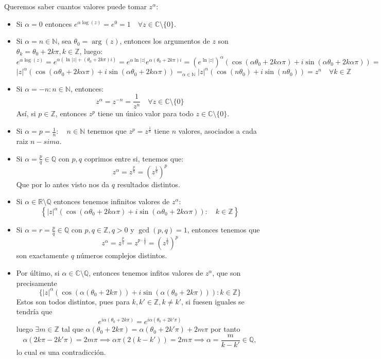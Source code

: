 Queremos saber cuantos valores puede tomar $z^\alpha$:
\begin{itemize}
    \item Si $\alpha = 0$ entonces $e^{\alpha \log(z)} = e^0 = 1 \quad \forall z \in \mathbb{C} \setminus \{0\}$.
    \item Si $\alpha = n \in \mathbb{N}$, sea $\theta_0 = \arg(z)$, entonces los argumentos de $z$ son $\theta_k = \theta_0 + 2k\pi, k \in \mathbb{Z}$, luego: 
    \[
    e^{\alpha \log(z)} = 
    e^{\alpha(\ln|z| + (\theta_0 + 2k\pi)i)} =
    e^{\alpha \ln|z|} e^{\alpha (\theta_0 + 2k\pi)i} = 
    \left(e^{\ln|z|}\right)^\alpha \left(\cos(\alpha \theta_0 + 2k\alpha \pi) + i\sin(\alpha \theta_0 + 2k\alpha \pi)\right) =
    \]
    \[
    |z|^\alpha \left(\cos(\alpha \theta_0 + 2k\alpha \pi) + i\sin(\alpha \theta_0 + 2k\alpha \pi)\right) =_{\alpha \in \mathbb{N}}
    |z|^n \left( \cos (n\theta_0) + i \sin (n\theta_0) \right) =
    z^n \quad \forall k \in \mathbb{Z}
    \]
    \item Si $\alpha = -n: n \in \mathbb{N}$, entonces:
    \[
    z^\alpha = z^{-n} = \frac{1}{z^n} \quad \forall z \in \mathbb{C} \setminus \{0\}
    \]
    Así, si $p \in \mathbb{Z}$, entonces $z^p$ tiene un único valor para todo $z \in \mathbb{C} \setminus \{0\}$.
    \item Si $\alpha = p = \frac{1}{n} : \quad n \in \mathbb{N}$ tenemos que $z^p=z^{\frac{1}{n}}$ tiene $n$ valores, asociados a cada raiz $n-sima$.
    \item Si $\alpha = \frac{p}{q} \in \mathbb{Q}$ con $p,q$ coprimos entre si, tenemos que:
    \[
    z^\alpha = z^{\frac{p}{q}} = \left(z^{\frac{1}{q}}\right)^p
    \]
    Que por lo antes visto nos da $q$ resultados distintos.
    \item Si $\alpha \in \mathbb{R} \setminus \mathbb{Q}$ entonces tenemos infinitos valores de $z^\alpha$:
    \[
    \left\{ 
    |z|^\alpha \left(\cos(\alpha \theta_0 + 2k\alpha \pi) + i\sin(\alpha \theta_0 + 2k\alpha \pi)\right)
    : \quad k \in \mathbb{Z}
    \right\}
    \]
    \item Si $\alpha = r =\frac{p}{q} \in \mathbb{Q}$ con $p,q \in \mathbb{Z}, q > 0$ y $\gcd(p,q) = 1$, entonces tenemos que
    \[
        z^\alpha = z^{\frac{p}{q}} = z^{p \cdot \frac{1}{q}} = (z^{\frac{1}{q}})^p
    \]
    son exactamente $q$ números complejos distintos.
    \item Por último, si $\alpha \in \mathbb{C} \setminus \mathbb{Q}$, entonces tenemos infitos valores de $z^\alpha$, que son precisamente
    \[
        \{|z|^\alpha (\cos(\alpha(\theta_0 + 2k\pi)) + i\sin(\alpha(\theta_0 + 2k\pi))) : k \in \mathbb{Z}\}
    \]
    Estos son todos distintos, pues para $k,k' \in \mathbb{Z}, k \neq k'$, si fuesen iguales se tendría que
    \[
        e^{i\alpha(\theta_0 + 2k\pi)} = e^{i\alpha(\theta_0 + 2k'\pi)} 
    \]
    luego $\exists m \in \mathbb{Z}$ tal que $\alpha(\theta_0 + 2k\pi) = \alpha(\theta_0 + 2k'\pi) + 2m\pi$ por tanto
    \[
        \alpha (2k\pi - 2k'\pi) = 2m\pi \implies \alpha \pi (2(k-k')) = 2m\pi \implies \alpha = \frac{m}{k-k'} \in \mathbb{Q},
    \]
    lo cual es una contradicción.
\end{itemize}

